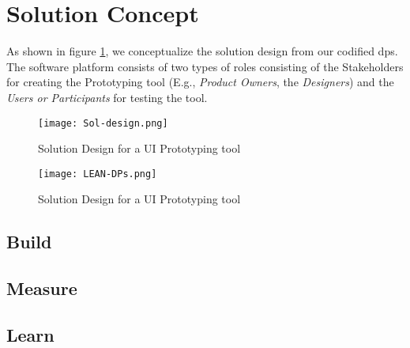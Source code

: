 \section{Solution Concept}
\label{design:section:solutionconcept}
As shown in figure \ref{fig:design:solutiondesign}, we conceptualize the solution design from our codified \ac{dp}s.
The software platform consists of two types of roles consisting of the Stakeholders for creating the Prototyping tool (E.g., \textit{Product Owners}, the \textit{Designers}) and the \textit{Users or Participants} for testing the tool.
\begin{figure}[htbp!]
  \centering    
  \texttt{[image: Sol-design.png]}
  \caption[Solution Design]{Solution Design for a UI Prototyping tool}
  \label{fig:design:solutiondesign}
\end{figure}

\begin{figure}[htbp!]
  \centering    
  \texttt{[image: LEAN-DPs.png]}
  \caption[Solution Design]{Solution Design for a UI Prototyping tool}
  \label{fig:design:lean}
\end{figure}

\subsection{Build}
\label{design:section:build}

\subsection{Measure}
\label{design:section:measure}
\subsection{Learn}
\label{design:section:learn}